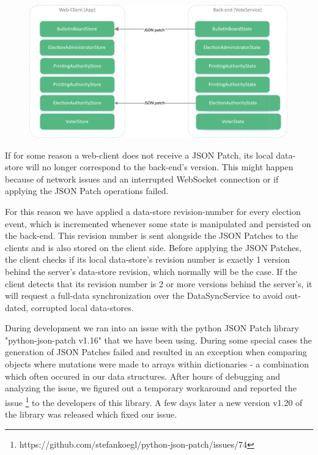 \begin{figure}
\begin{center}
\includegraphics[scale=0.62]{assets/DatastoresJsonPatch.pdf}
\label{Data-Sync with JSON Patches}%
\end{center}
\end{figure}

If for some reason a web-client does not receive a JSON Patch, its local data-store will no longer correspond to the back-end's version. This might happen because of network issues and an interrupted WebSocket connection or if applying the JSON Patch operations failed.

For this reason we have applied a data-store revision-number for every election event, which is incremented whenever some state is manipulated and persisted on the back-end. This revision number is sent alongside the JSON Patches to the clients and is also stored on the client side. Before applying the JSON Patches, the client checks if its local data-store's revision number is exactly 1 version behind the server's data-store revision, which normally will be the case. If the client detects that its revision number is 2 or more versions behind the server's, it will request a full-data synchronization over the DataSyncService to avoid out-dated, corrupted local data-stores.

During development we ran into an issue with the python JSON Patch library "{}python-json-patch v1.16"{} that we have been using. During some special cases the generation of JSON Patches failed and resulted in an exception when comparing objects where mutations were made to arrays within dictionaries - a combination which often occured in our data structures. After hours of debugging and analyzing the issue, we figured out a temporary workaround and reported the issue \footnote{https://github.com/stefankoegl/python-json-patch/issues/74} to the developers of this library. A few days later a new version v1.20 of the library was released which fixed our issue.

